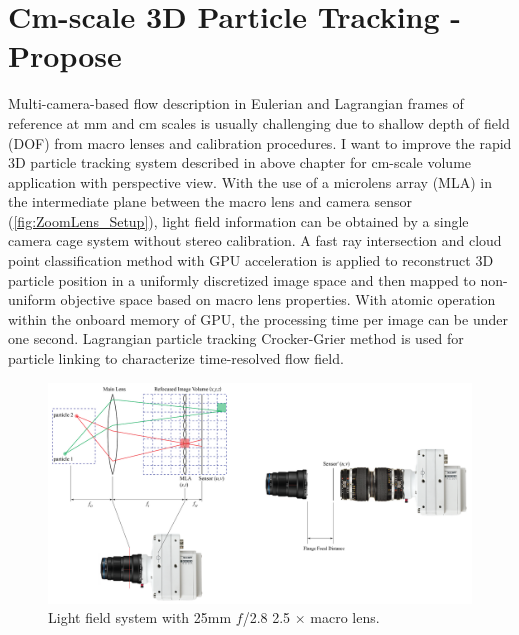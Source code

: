 \documentclass[draftthesis,fullpage]{uiucthesis}
\begin{document}
\chapter{Cm-scale 3D Particle Tracking - Propose}
Multi-camera-based flow description in Eulerian and Lagrangian frames of reference at mm and cm scales is usually challenging due to shallow depth of field (DOF) from macro lenses and calibration procedures. I want to improve the rapid 3D particle tracking system described in above chapter for cm-scale volume application with perspective view. With the use of a microlens array (MLA) in the intermediate plane between the macro lens and camera sensor (\autoref{fig:ZoomLens_Setup}), light field information can be obtained by a single camera cage system without stereo calibration. A fast ray intersection and cloud point classification method with GPU acceleration is applied to reconstruct 3D particle position in a uniformly discretized image space and then mapped to non-uniform objective space based on macro lens properties. With atomic operation within the onboard memory of GPU, the processing time per image can be under one second. Lagrangian particle tracking Crocker-Grier method is used for particle linking to characterize time-resolved flow field.

\begin{figure}[h]
  \centerline{\includegraphics[width = 0.7\linewidth]{fig/ZoomLens_Setup.png}} 
  \caption{Light field system with 25mm $f$/2.8 2.5 $\times$ macro lens. 
  }
\label{fig:ZoomLens_Setup}
\end{figure}
\end{document}
